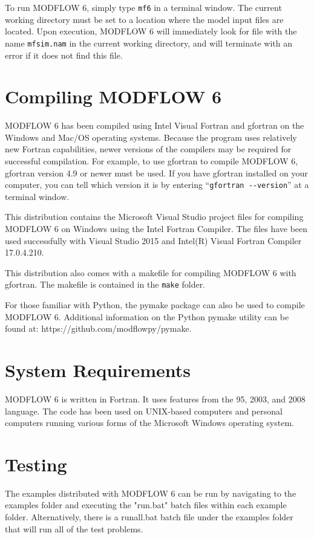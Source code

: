 \documentclass[11pt,twoside,twocolumn]{usgsreport}
\begin{document}
To run MODFLOW 6, simply type \texttt{mf6} in a terminal window.  The current working directory must be set to a location where the model input files are located.  Upon execution, MODFLOW 6 will immediately look for file with the name \texttt{mfsim.nam} in the current working directory, and will terminate with an error if it does not find this file.

\section{Compiling MODFLOW 6}
MODFLOW 6 has been compiled using Intel Visual Fortran and gfortran on the Windows and Mac/OS operating systems.  Because the program uses relatively new Fortran capabilities, newer versions of the compilers may be required for successful compilation.  For example, to use gfortran to compile MODFLOW 6, gfortran version 4.9 or newer must be used.  If you have gfortran installed on your computer, you can tell which version it is by entering ``\verb|gfortran --version|'' at a terminal window.

This distribution contains the Microsoft Visual Studio project files for compiling MODFLOW 6 on Windows using the Intel Fortran Compiler.  The files have been used successfully with Visual Studio 2015 and Intel(R) Visual Fortran Compiler 17.0.4.210.

This distribution also comes with a makefile for compiling MODFLOW 6 with gfortran.  The makefile is contained in the \texttt{make} folder.

For those familiar with Python, the pymake package can also be used to compile MODFLOW 6.  Additional information on the Python pymake utility can be found at: https://github.com/modflowpy/pymake.  

\section{System Requirements}
MODFLOW 6 is written in Fortran.  It uses features from the 95, 2003, and 2008 language.  The code has been used on UNIX-based computers and personal computers running various forms of the Microsoft Windows operating system.

\section{Testing}
The examples distributed with MODFLOW 6 can be run by navigating to the examples folder and executing the "run.bat" batch files within each example folder.  Alternatively, there is a runall.bat batch file under the examples folder that will run all of the test problems.
\end{document}

